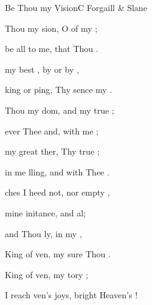 \begin{song}{Be Thou my Vision}{C}
    {\SBPubDom}
    {Forgaill \& Slane}
    {}
    {\NotCCLIed}


  \begin{SBVerse}
     Thou my sion, 
        O  of my ;

     be all  to me, 
         that Thou .

     my best , 
        by  or by ,

    king or ping, 
        Thy sence my .

    \Ch{[Interlude:}{}    \Ch{C]}{}
  \end{SBVerse}

  \begin{SBVerse}
     Thou my dom, 
        and  my true ;

     ever  Thee and, 
         with me ;

     my great ther, 
         Thy true ;

     in me lling, 
        and  with Thee .

    \Ch{[Interlude:}{}    \Ch{C]}{}
  \end{SBVerse}


  \begin{SBVerse}
    ches I heed  not, 
        nor  empty ,

     mine initance, 
         and al;

     and Thou ly, 
         in my ,

     King of ven, 
        my sure Thou .

    \Ch{[Interlude:}{}    \Ch{D]}{}
  \end{SBVerse}


  \begin{SBVerse}
     King of ven, 
        my tory ;

     I reach ven's joys, 
         bright Heaven's !


\end{SBVerse}
\end{song}
